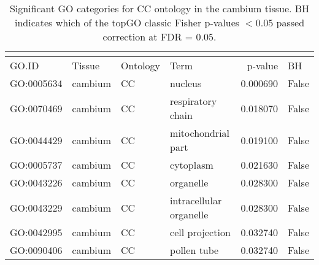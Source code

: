 \begin{longtable}{llllrl}
\caption{Significant GO categories for CC ontology in the cambium tissue. BH indicates which of the topGO classic Fisher p-values $< 0.05$ passed correction at FDR = 0.05.}\\
\label{tab:go-cambium-CC}\\
\toprule
GO.ID & Tissue & Ontology & Term & p-value & BH \\
\midrule
GO:0005634 & cambium & CC &                   nucleus  & 0.000690 &   False \\
GO:0070469 & cambium & CC &         respiratory chain  & 0.018070 &   False \\
GO:0044429 & cambium & CC &        mitochondrial part  & 0.019100 &   False \\
GO:0005737 & cambium & CC &                 cytoplasm  & 0.021630 &   False \\
GO:0043226 & cambium & CC &                 organelle  & 0.028300 &   False \\
GO:0043229 & cambium & CC &   intracellular organelle  & 0.028300 &   False \\
GO:0042995 & cambium & CC &           cell projection  & 0.032740 &   False \\
GO:0090406 & cambium & CC &               pollen tube  & 0.032740 &   False \\
\bottomrule
\end{longtable}
